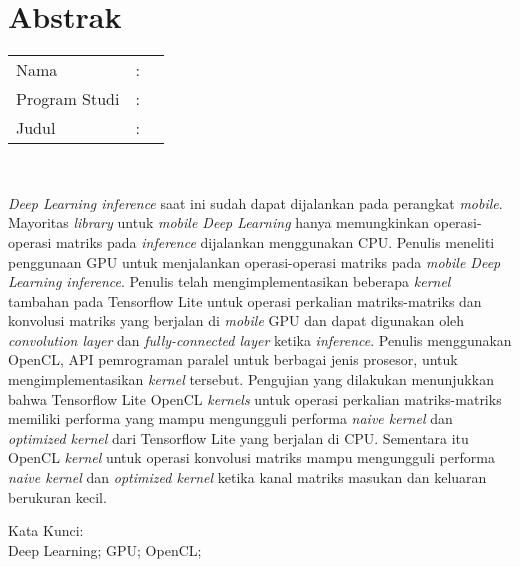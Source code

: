 %
%
%

\chapter*{Abstrak}

\vspace*{0.2cm}

\noindent \begin{tabular}{l l p{10cm}}
	Nama&: & \penulis \\
	Program Studi&: & \program \\
	Judul&: & \judul \\
\end{tabular} \\ 

\vspace*{0.5cm}

\noindent 
\textit{Deep Learning inference} saat ini sudah dapat dijalankan pada perangkat \textit{mobile}. Mayoritas \textit{library} untuk \textit{mobile Deep Learning} hanya memungkinkan operasi-operasi matriks pada \textit{inference} dijalankan menggunakan CPU. Penulis meneliti penggunaan GPU untuk menjalankan operasi-operasi matriks pada \textit{mobile Deep Learning inference}. Penulis telah mengimplementasikan beberapa \textit{kernel} tambahan pada Tensorflow Lite untuk operasi perkalian matriks-matriks dan konvolusi matriks yang berjalan di \textit{mobile} GPU dan dapat digunakan oleh \textit{convolution layer} dan \textit{fully-connected layer} ketika \textit{inference}. Penulis menggunakan OpenCL, API pemrograman paralel untuk berbagai jenis prosesor, untuk mengimplementasikan \textit{kernel} tersebut. Pengujian yang dilakukan menunjukkan bahwa Tensorflow Lite OpenCL \textit{kernels} untuk operasi perkalian matriks-matriks memiliki performa yang mampu mengungguli performa \textit{naive kernel} dan \textit{optimized kernel} dari Tensorflow Lite yang berjalan di CPU. Sementara itu OpenCL \textit{kernel} untuk operasi konvolusi matriks mampu mengungguli performa \textit{naive kernel} dan \textit{optimized kernel} ketika kanal matriks masukan dan keluaran berukuran kecil.
\\

\vspace*{0.2cm}

\noindent Kata Kunci: \\ 
\noindent Deep Learning; GPU; OpenCL; \\

\newpage